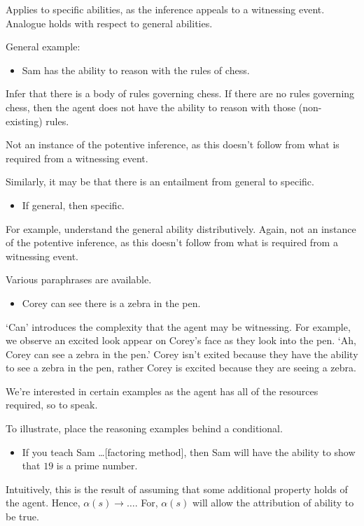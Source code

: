 \documentclass[10pt]{article}
\begin{document}
\begin{note}
  Applies to specific abilities, as the inference appeals to a witnessing event.
  Analogue holds with respect to general abilities.

  General example:
  \begin{itemize}
  \item Sam has the ability to reason with the rules of chess.
  \end{itemize}
  Infer that there is a body of rules governing chess.
  If there are no rules governing chess, then the agent does not have the ability to reason with those (non-existing) rules.

  Not an instance of the potentive inference, as this doesn't follow from what is required from a witnessing event.

  Similarly, it may be that there is an entailment from general to specific.
  \begin{itemize}
  \item If general, then specific.
  \end{itemize}
  For example, understand the general ability distributively.
  Again, not an instance of the potentive inference, as this doesn't follow from what is required from a witnessing event.
\end{note}

\begin{note}
  Various paraphrases are available.
  \begin{itemize}
  \item Corey can see there is a zebra in the pen.
  \end{itemize}
  `Can' introduces the complexity that the agent may be witnessing.
  For example, we observe an excited look appear on Corey's face as they look into the pen.
  `Ah, Corey can see a zebra in the pen.'
  Corey isn't exited because they have the ability to see a zebra in the pen, rather Corey is excited because they are seeing a zebra.
\end{note}

\begin{note}
  We're interested in certain examples as the agent has all of the resources required, so to speak.

  To illustrate, place the reasoning examples behind a conditional.
  \begin{itemize}
  \item If you teach Sam \dots [factoring method], then Sam will have the ability to show that \(19\) is a prime number.
  \end{itemize}
  Intuitively, this is the result of assuming that some additional property holds of the agent.
  Hence, \(\alpha(s) \rightarrow \dots\).
  For, \(\alpha(s)\) will allow the attribution of ability to be true.
\end{note}
\end{document}
